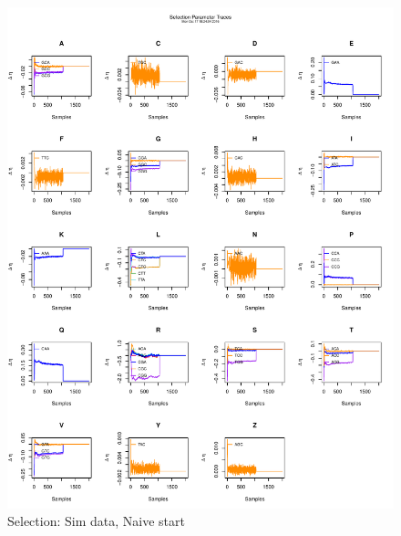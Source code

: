 \documentclass[11pt]{labbook}
\begin{document}
    \begin{figure}
        \centering
        \includegraphics[scale=.65]{FONSE_Plots/2016/October_17/simulated_naive_sel}
        \caption{Selection: Sim data, Naive start}
        \label{fig:OCT17_S.N.SEL}
    \end{figure}
\end{document}
